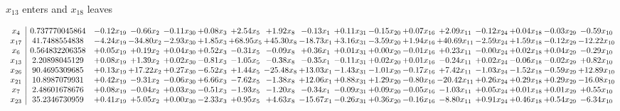 \documentclass[9pt]{article}
\begin{document}
 $ x_{13} $ enters and $ x_{18} $ leaves 

 \[\begin{array}{c| c c@{\hskip 2pt} c@{\hskip 2pt} c@{\hskip 2pt} c@{\hskip 2pt} c@{\hskip 2pt} c@{\hskip 2pt} c@{\hskip 2pt} c@{\hskip 2pt} c@{\hskip 2pt} c@{\hskip 2pt} c@{\hskip 2pt} c@{\hskip 2pt} c@{\hskip 2pt} c@{\hskip 2pt} c@{\hskip 2pt} }
 x_{4}   &  0.737770045864 & -0.12 x_{19} & -0.66 x_{2} & -0.11 x_{30} & +  0.08 x_{3} & +  2.54 x_{5} & +  1.92 x_{8} & -0.13 x_{1} & +  0.11 x_{31} & -0.15 x_{20} & +  0.07 x_{16} & +  2.09 x_{11} & -0.12 x_{24} & +  0.04 x_{18} & -0.03 x_{29} & -0.59 x_{10}\\
 x_{17}   &  41.7488554838 & -4.24 x_{19} & -34.80 x_{2} & -2.93 x_{30} & +  1.85 x_{3} & + 68.95 x_{5} & + 45.30 x_{8} & -18.73 x_{1} & +  3.16 x_{31} & -3.59 x_{20} & +  1.94 x_{16} & + 40.69 x_{11} & -2.59 x_{24} & +  1.59 x_{18} & -0.12 x_{29} & -12.22 x_{10}\\
 x_{6}   &  0.564832206358 & +  0.05 x_{19} & +  0.19 x_{2} & +  0.04 x_{30} & +  0.52 x_{3} & -0.31 x_{5} & -0.09 x_{8} & +  0.36 x_{1} & +  0.01 x_{31} & +  0.00 x_{20} & -0.01 x_{16} & +  0.23 x_{11} & -0.00 x_{24} & +  0.02 x_{18} & +  0.04 x_{29} & -0.29 x_{10}\\
 x_{13}   &  2.20898045129 & +  0.08 x_{19} & +  1.39 x_{2} & +  0.02 x_{30} & -0.81 x_{3} & -1.05 x_{5} & -0.38 x_{8} & -0.35 x_{1} & -0.11 x_{31} & +  0.02 x_{20} & +  0.01 x_{16} & -0.24 x_{11} & +  0.02 x_{24} & -0.06 x_{18} & -0.02 x_{29} & +  0.82 x_{10}\\
 x_{26}   &  90.4695309685 & +  0.13 x_{19} & + 17.22 x_{2} & +  0.27 x_{30} & -6.52 x_{3} & +  1.44 x_{5} & -25.48 x_{8} & + 13.03 x_{1} & -1.43 x_{31} & -1.01 x_{20} & -0.17 x_{16} & +  7.42 x_{11} & -1.03 x_{24} & -1.52 x_{18} & -0.59 x_{29} & + 12.89 x_{10}\\
 x_{21}   &  10.8987079931 & +  0.42 x_{19} & -9.31 x_{2} & -0.06 x_{30} & +  6.66 x_{3} & -7.62 x_{5} & -1.38 x_{8} & + 12.06 x_{1} & +  0.88 x_{31} & +  1.29 x_{20} & -0.80 x_{16} & -20.42 x_{11} & +  0.26 x_{24} & +  0.29 x_{18} & +  0.29 x_{29} & -16.08 x_{10}\\
 x_{7}   &  2.48601678676 & +  0.08 x_{19} & -0.04 x_{2} & +  0.03 x_{30} & -0.51 x_{3} & -1.93 x_{5} & -1.20 x_{8} & -0.34 x_{1} & -0.09 x_{31} & +  0.09 x_{20} & -0.05 x_{16} & -1.03 x_{11} & +  0.05 x_{24} & +  0.01 x_{18} & +  0.01 x_{29} & +  0.55 x_{10}\\
 x_{23}   &  35.2346730959 & +  0.41 x_{19} & +  5.05 x_{2} & +  0.00 x_{30} & -2.33 x_{3} & +  0.95 x_{5} & +  4.63 x_{8} & -15.67 x_{1} & -0.26 x_{31} & +  0.36 x_{20} & -0.16 x_{16} & -8.80 x_{11} & +  0.91 x_{24} & +  0.46 x_{18} & +  0.54 x_{29} & -6.34 x_{10}\\

\end{array}\]
\end{document}
